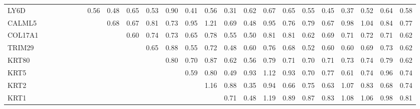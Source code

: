 \begin{longtable}{lrrrrrrrrrrrrrrrrrrrrrrr}
LY6D     &            &            &           &            &            &            &         0.56 &          0.48 &         0.65 &        0.53 &       0.90 &       0.41 &       0.56 &      0.31 &        0.62 &        0.67 &       0.65 &       0.55 &           0.45 &         0.37 &         0.52 &       0.64 &          0.58 \\
CALML5   &            &            &           &            &            &            &              &          0.68 &         0.67 &        0.81 &       0.73 &       0.95 &       1.21 &      0.69 &        0.48 &        0.95 &       0.76 &       0.79 &           0.67 &         0.98 &         1.04 &       0.84 &          0.77 \\
COL17A1  &            &            &           &            &            &            &              &               &         0.60 &        0.74 &       0.73 &       0.65 &       0.78 &      0.55 &        0.50 &        0.81 &       0.81 &       0.62 &           0.69 &         0.71 &         0.72 &       0.71 &          0.62 \\
TRIM29   &            &            &           &            &            &            &              &               &              &        0.65 &       0.88 &       0.55 &       0.72 &      0.48 &        0.60 &        0.76 &       0.68 &       0.52 &           0.60 &         0.60 &         0.69 &       0.73 &          0.62 \\
KRT80    &            &            &           &            &            &            &              &               &              &             &       0.80 &       0.70 &       0.87 &      0.62 &        0.56 &        0.79 &       0.71 &       0.70 &           0.71 &         0.73 &         0.74 &       0.79 &          0.62 \\
KRT5     &            &            &           &            &            &            &              &               &              &             &            &       0.59 &       0.80 &      0.49 &        0.93 &        1.12 &       0.93 &       0.70 &           0.77 &         0.61 &         0.74 &       0.96 &          0.74 \\
KRT2     &            &            &           &            &            &            &              &               &              &             &            &            &       1.16 &      0.88 &        0.35 &        0.94 &       0.66 &       0.75 &           0.63 &         1.07 &         0.83 &       0.68 &          0.74 \\
KRT1     &            &            &           &            &            &            &              &               &              &             &            &            &            &      0.71 &        0.48 &        1.19 &       0.89 &       0.87 &           0.83 &         1.08 &         1.06 &       0.98 &          0.81 \\

\end{longtable}
